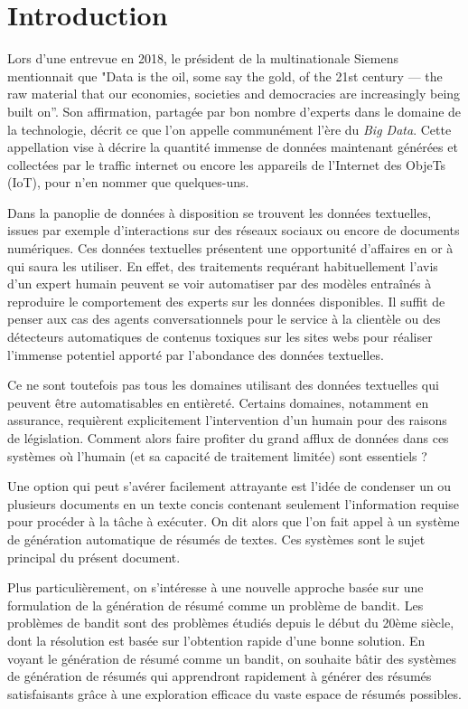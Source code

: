 \chapter*{Introduction}
\label{chap:introduction}

Lors d'une entrevue en 2018, le président de la multinationale Siemens 
mentionnait que "Data is the oil, some say the gold, of the 21st century
— the raw material that our economies, societies and democracies are 
increasingly being built on”. 
Son affirmation, partagée par bon nombre d'experts dans le domaine de la
technologie, décrit ce que l'on appelle communément l'ère du \textit{Big Data}.
Cette appellation vise à décrire la quantité immense de données maintenant 
générées et collectées par le traffic internet ou encore les appareils de 
l'Internet des ObjeTs (IoT), pour n'en nommer que quelques-uns.

Dans la panoplie de données à disposition se trouvent les données textuelles, 
issues par exemple d'interactions sur des réseaux sociaux ou encore de documents 
numériques.
Ces données textuelles présentent une opportunité d'affaires en or à qui saura
les utiliser.
En effet, des traitements requérant habituellement l'avis d'un expert humain 
peuvent se voir automatiser par des modèles entraînés à reproduire le comportement
des experts sur les données disponibles.
Il suffit de penser aux cas des agents conversationnels pour le service à 
la clientèle ou des détecteurs automatiques de contenus toxiques 
sur les sites webs pour réaliser l'immense potentiel apporté par l'abondance
des données textuelles.

Ce ne sont toutefois pas tous les domaines utilisant des données textuelles 
qui peuvent être automatisables en entièreté.
Certains domaines, notamment en assurance, requièrent explicitement l'intervention 
d'un humain pour des raisons de législation.
Comment alors faire profiter du grand afflux de données dans ces systèmes où l'humain (et
sa capacité de traitement limitée) sont essentiels ?

Une option qui peut s'avérer facilement attrayante est l'idée de condenser un ou plusieurs
documents en un texte concis contenant seulement l'information requise pour procéder à la
tâche à exécuter.
On dit alors que l'on fait appel à un système de génération automatique de résumés de textes.
Ces systèmes sont le sujet principal du présent document.

Plus particulièrement, on s'intéresse à une nouvelle approche basée sur une formulation 
de la génération de résumé comme un problème de bandit.
Les problèmes de bandit sont des problèmes étudiés depuis le début du 20ème
siècle, dont la résolution est basée sur l'obtention rapide d'une bonne solution.
En voyant le génération de résumé comme un bandit, on souhaite bâtir 
des systèmes de génération de résumés qui apprendront rapidement à générer 
des résumés satisfaisants grâce à une exploration efficace du vaste espace de résumés 
possibles. 

